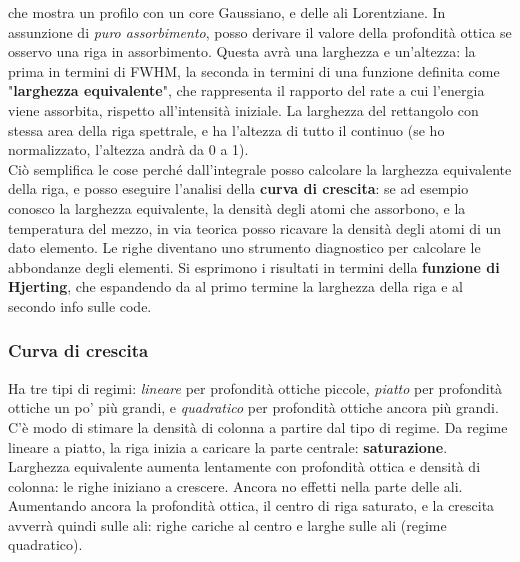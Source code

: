 che mostra un profilo con un core Gaussiano, e delle ali Lorentziane.
In assunzione di \textit{puro assorbimento}, posso derivare il valore della profondità ottica se osservo una riga in assorbimento.
Questa avrà una larghezza e un'altezza: la prima in termini di FWHM, la seconda in termini di una funzione definita come "\textbf{larghezza equivalente}", che rappresenta il rapporto del rate a cui l'energia viene assorbita, rispetto all'intensità iniziale. 
La larghezza del rettangolo con stessa area della riga spettrale, e ha l'altezza di tutto il continuo (se ho normalizzato, l'altezza andrà da 0 a 1).\\
Ciò semplifica le cose perché dall'integrale posso calcolare la larghezza equivalente della riga, e posso eseguire l'analisi della \textbf{curva di crescita}: se ad esempio conosco la larghezza equivalente, la densità degli atomi che assorbono, e la temperatura del mezzo, in via teorica posso ricavare la densità degli atomi di un dato elemento.
Le righe diventano uno strumento diagnostico per calcolare le abbondanze degli elementi.
Si esprimono i risultati in termini della \textbf{funzione di Hjerting}, che espandendo da al primo termine la larghezza della riga e al secondo info sulle code. 
\subsubsection*{Curva di crescita}
Ha tre tipi di regimi: \textit{lineare} per profondità ottiche piccole, \textit{piatto} per profondità ottiche un po' più grandi, e \textit{quadratico} per profondità ottiche ancora più grandi.
C'è modo di stimare la densità di colonna a partire dal tipo di regime.
Da regime lineare a piatto, la riga inizia a caricare la parte centrale: \textbf{saturazione}. Larghezza equivalente aumenta lentamente con profondità ottica e densità di colonna: le righe iniziano a crescere. Ancora no effetti nella parte delle ali.\\
Aumentando ancora la profondità ottica, il centro di riga saturato, e la crescita avverrà quindi sulle ali: righe cariche al centro e larghe sulle ali (regime quadratico).
